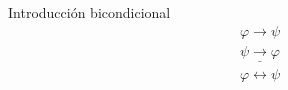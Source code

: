 \begin{ruleinf} \label{relinf_equiv} Introducción bicondicional
	\begin{equation}
	\begin{gathered}
		\varphi \to \psi  \\
		\underline {\psi \to \varphi } \\
		\varphi \leftrightarrow \psi 
	\end{gathered}
	\end{equation}
\end{ruleinf}
